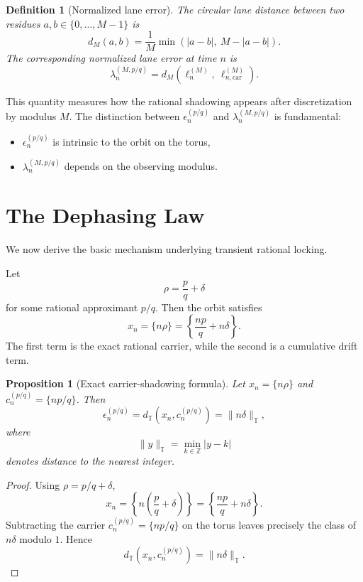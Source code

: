 \documentclass[11pt]{article}
\newtheorem{definition}[theorem]{Definition}
\newtheorem{proposition}[theorem]{Proposition}
\newcommand{\T}{\mathbb{T}}
\begin{document}
\begin{definition}[Normalized lane error]
The circular lane distance between two residues $a,b\in\{0,\dots,M-1\}$ is
\[
d_M(a,b)=\frac{1}{M}\min(|a-b|,\ M-|a-b|).
\]
The corresponding normalized lane error at time $n$ is
\[
\lambda_n^{(M,p/q)}
=
d_M\!\left(\ell_n^{(M)},\ \ell_{n,\mathrm{car}}^{(M)}\right).
\]
\end{definition}

This quantity measures how the rational shadowing appears after discretization by modulus $M$. The distinction between $\epsilon_n^{(p/q)}$ and $\lambda_n^{(M,p/q)}$ is fundamental:
\begin{itemize}
    \item $\epsilon_n^{(p/q)}$ is intrinsic to the orbit on the torus,
    \item $\lambda_n^{(M,p/q)}$ depends on the observing modulus.
\end{itemize}

\section{The Dephasing Law}

We now derive the basic mechanism underlying transient rational locking.

Let
\[
\rho=\frac{p}{q}+\delta
\]
for some rational approximant $p/q$. Then the orbit satisfies
\[
x_n
=
\{n\rho\}
=
\left\{\frac{np}{q}+n\delta\right\}.
\]
The first term is the exact rational carrier, while the second is a cumulative drift term.

\begin{proposition}[Exact carrier-shadowing formula]
Let $x_n=\{n\rho\}$ and $c_n^{(p/q)}=\{np/q\}$. Then
\begin{equation}
\epsilon_n^{(p/q)}
=
d_{\T}\!\left(x_n,c_n^{(p/q)}\right)
=
\lVert n\delta\rVert_{\T},
\end{equation}
where
\[
\lVert y\rVert_{\T}=\min_{k\in\mathbb{Z}}|y-k|
\]
denotes distance to the nearest integer.
\end{proposition}

\begin{proof}
Using $\rho=p/q+\delta$,
\[
x_n
=
\left\{n\left(\frac{p}{q}+\delta\right)\right\}
=
\left\{\frac{np}{q}+n\delta\right\}.
\]
Subtracting the carrier $c_n^{(p/q)}=\{np/q\}$ on the torus leaves precisely the class of $n\delta$ modulo $1$. Hence
\[
d_{\T}\!\left(x_n,c_n^{(p/q)}\right)=\lVert n\delta\rVert_{\T}.
\]
\end{proof}
\end{document}
